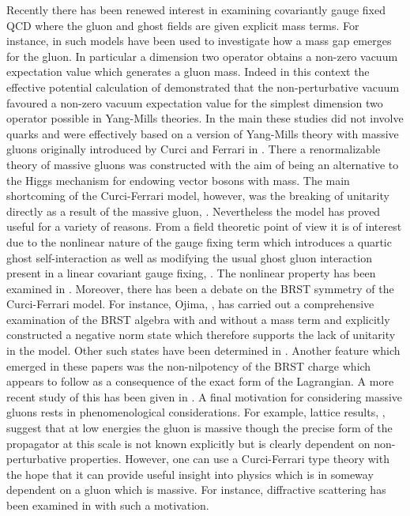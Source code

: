 \documentclass[a4paper,11pt]{article}
\begin{document}
Recently there has been renewed interest in examining covariantly gauge fixed
QCD where the gluon and ghost fields are given explicit mass terms. For 
instance, in \cite{1,2,3} such models have been used to investigate how a mass 
gap emerges for the gluon. In particular a dimension two operator obtains a 
non-zero vacuum expectation value which generates a gluon mass. Indeed in this 
context the effective potential calculation of \cite{3} demonstrated that the 
non-perturbative vacuum favoured a non-zero vacuum expectation value for the 
simplest dimension two operator possible in Yang-Mills theories. In the main 
these studies did not involve quarks and were effectively based on a version of
Yang-Mills theory with massive gluons originally introduced by Curci and 
Ferrari in \cite{4}. There a renormalizable theory of massive gluons was 
constructed with the aim of being an alternative to the Higgs mechanism for 
endowing vector bosons with mass. The main shortcoming of the Curci-Ferrari 
model, however, was the breaking of unitarity directly as a result of the 
massive gluon, \cite{5,6,7,8,9,10}. Nevertheless the model has proved useful 
for a variety of reasons. From a field theoretic point of view it is of 
interest due to the nonlinear nature of the gauge fixing term which introduces 
a quartic ghost self-interaction as well as modifying the usual ghost gluon 
interaction present in a linear covariant gauge fixing, \cite{4}. The nonlinear
property has been examined in \cite{10,11}. Moreover, there has been a debate 
on the BRST symmetry of the Curci-Ferrari model. For instance, Ojima, \cite{6},
has carried out a comprehensive examination of the BRST algebra with and 
without a mass term and explicitly constructed a negative norm state which 
therefore supports the lack of unitarity in the model. Other such states have 
been determined in \cite{8}. Another feature which emerged in these papers was 
the non-nilpotency of the BRST charge which appears to follow as a consequence 
of the exact form of the Lagrangian. A more recent study of this has been given
in \cite{12}. A final motivation for considering massive gluons rests in 
phenomenological considerations. For example, lattice results, \cite{13}, 
suggest that at low energies the gluon is massive though the precise form of 
the propagator at this scale is not known explicitly but is clearly dependent 
on non-perturbative properties. However, one can use a Curci-Ferrari type 
theory with the hope that it can provide useful insight into physics which is 
in someway dependent on a gluon which is massive. For instance, diffractive 
scattering has been examined in \cite{14} with such a motivation. 
\end{document}
